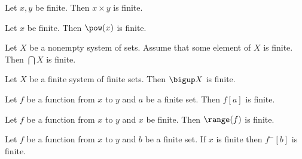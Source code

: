 \documentclass[../../tuples-and-cartesian-products.ftl.tex]{subfiles}
\begin{document}
\begin{forthel}
    \begin{proposition}[1613072347168768]
      Let $x,y$ be finite.
      Then $x \times y$ is finite.
    \end{proposition}

    \begin{proposition}[2155195855273984]
      Let $x$ be finite.
      Then $\pow(x)$ is finite.
    \end{proposition}

    \begin{proposition}[7884579446718464]
      Let $X$ be a nonempty system of sets.
      Assume that some element of $X$ is finite.
      Then $\bigcap X$ is finite.
    \end{proposition}

    \begin{proposition}[6578041140543488]
      Let $X$ be a finite system of finite sets.
      Then $\bigup X$ is finite.
    \end{proposition}

    \begin{proposition}[8660803444015104]
      Let $f$ be a function from $x$ to $y$ and $a$ be a finite set.
      Then $f[a]$ is finite.
    \end{proposition}

    \begin{corollary}[2307651954278400]
      Let $f$ be a function from $x$ to $y$ and $x$ be finite.
      Then $\range(f)$ is finite.
    \end{corollary}

    \begin{proposition}[5577541272207360]
      Let $f$ be a function from $x$ to $y$ and $b$ be a finite set.
      If $x$ is finite then $f^{-}[b]$ is finite.
    \end{proposition}
  \end{forthel}
\end{document}

